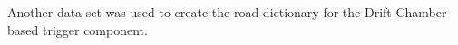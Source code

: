 Another data set was used to create the road dictionary for the Drift Chamber-based trigger component.

